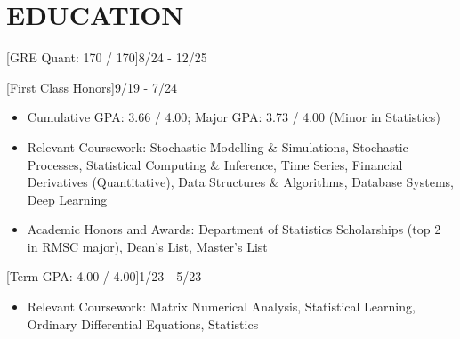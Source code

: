 \documentclass[cmu]{resume}
\begin{document}
    \address{160 Water Street, New York, NY 10038}
    \maketitle
    \section{EDUCATION}
    [GRE Quant: 170 / 170]{8/24 - 12/25}

    [First Class Honors]{9/19 - 7/24}
    \begin{itemize}
        \item Cumulative GPA: 3.66 / 4.00; Major GPA: 3.73 / 4.00 (Minor in Statistics)
        \item Relevant Coursework: Stochastic Modelling \& Simulations, Stochastic Processes, Statistical Computing \& Inference, Time Series, Financial Derivatives (Quantitative), Data Structures \& Algorithms, Database Systems, Deep Learning
        \item Academic Honors and Awards: Department of Statistics Scholarships (top 2 in RMSC major), Dean's List, Master's List
    \end{itemize}

    [Term GPA: 4.00 / 4.00]{1/23 - 5/23}
    \begin{itemize}
        \item Relevant Coursework: Matrix Numerical Analysis, Statistical Learning, Ordinary Differential Equations, Statistics
    \end{itemize}
\end{document}
